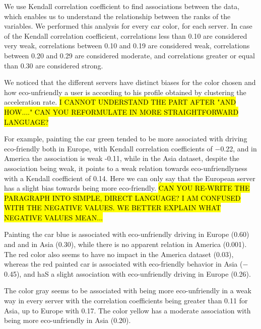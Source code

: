 \documentclass[preprint,authoryear,12pt]{elsarticle}
\begin{document}
We use Kendall correlation coefficient to find associations between the data, which enables us to understand the relationship between the ranks of the variables. We performed this analysis for every car color, for each server.
In case of the Kendall correlation coefficient, correlations less than 0.10 are considered very weak, correlations between 0.10 and 0.19 are considered weak, correlations between 0.20 and 0.29 are considered moderate, and correlations greater or equal than 0.30 are considered strong.

We noticed that the different servers have distinct biases for the color chosen and how eco-unfriendly a user is according to his profile obtained by clustering the acceleration rate. \hl{I CANNOT UNDERSTAND THE PART AFTER "AND HOW...." CAN YOU REFORMULATE IN MORE STRAIGHTFORWARD LANGUAGE?}

For example, painting the car green tended to be more associated with driving eco-friendly both in Europe, with Kendall correlation coefficients of $-$0.22, and in America the association is weak -0.11, while in the Asia dataset, despite the association being weak, it points to a weak relation towards eco-unfriendlyness with a Kendall coefficient of 0.14. Here we can only say that the European server has a slight bias towards being more eco-friendly. \hl{CAN YOU RE-WRITE THE PARAGRAPH INTO SIMPLE, DIRECT LANGUAGE? I AM CONFUSED WITH THE NEGATIVE VALUES. WE BETTER EXPLAIN WHAT NEGATIVE VALUES MEAN...}

Painting the car blue is associated with eco-unfriendly driving in Europe (0.60) and and in Asia (0.30), while there is no apparent relation in America (0.001).
The red color also seems to have no impact in the America dataset (0.03), whereas the red painted car is associated with eco-friendly behavior in Asia ($-$0.45), and haS a slight association with eco-unfriendly driving in Europe (0.26).

The color gray seems to be associated with being more eco-unfriendly in a weak way in every server with the correlation coefficients being greater than 0.11 for Asia, up to Europe with 0.17. The color yellow has a moderate association with being more eco-unfriendly in Asia (0.20).

%


\end{document}
